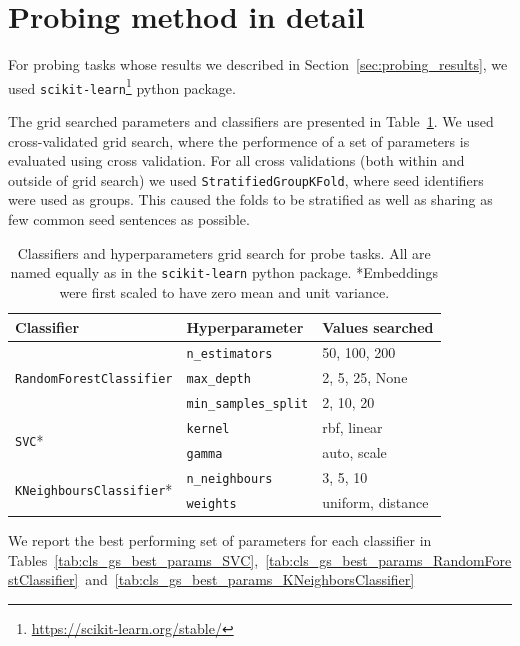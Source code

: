 \documentclass[11pt]{article}
\newcommand{\Cls}[1]{\texttt{#1}}
\begin{document}
\section{Probing method in detail}\label{appendix:probing_method}

For probing tasks whose results we described in
Section~\ref{sec:probing_results}, we used
\texttt{scikit-learn}\footnote{\url{https://scikit-learn.org/stable/}} python
package.

The grid searched parameters and classifiers are presented in
Table~\ref{tab:cls_gs_all_params}. We used cross-validated grid search, where
the performence of a set of parameters is evaluated using cross validation. For
all cross validations (both within and outside of grid search) we used
\texttt{StratifiedGroupKFold}, where seed identifiers were used as groups. This
caused the folds to be stratified as well as sharing as few common seed
sentences as possible.

\begin{table}[htp]
  \centering

  \begin{tabular}{l l l}
    \toprule
    Classifier & Hyperparameter & Values searched \\
    \midrule
    \multirow{3}{13em}{\Cls{RandomForestClassifier}}
    & \texttt{n\_estimators} & 50, 100, 200 \\
    & \texttt{max\_depth} & 2, 5, 25, None \\
    & \texttt{min\_samples\_split} & 2, 10, 20 \\
    \midrule
    \multirow{2}{13em}{\Cls{SVC}*}
    & \texttt{kernel} & rbf, linear \\
    & \texttt{gamma} & auto, scale\\
    \midrule
    \multirow{2}{13em}{\Cls{KNeighboursClassifier}*}
    & \texttt{n\_neighbours} & 3, 5, 10\\
    & \texttt{weights} & uniform, distance\\
    \bottomrule
  \end{tabular}

  \caption{Classifiers and hyperparameters grid search for probe tasks. All are
  named equally as in the \texttt{scikit-learn} python package. *Embeddings
  were first scaled to have zero mean and unit
  variance.}\label{tab:cls_gs_all_params}

\end{table}

We report the best performing set of parameters for each classifier in
Tables~\ref{tab:cls_gs_best_params_SVC},~\ref{tab:cls_gs_best_params_RandomForestClassifier}~and~\ref{tab:cls_gs_best_params_KNeighborsClassifier}
\end{document}
